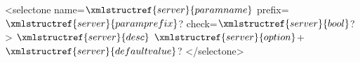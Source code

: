 <selectone name=$\xmlstructref{server}{paramname}$ prefix=$\xmlstructref{server}{paramprefix}$? check=$\xmlstructref{server}{bool}$? >
  $\xmlstructref{server}{desc}$
  $\xmlstructref{server}{option}$+
  $\xmlstructref{server}{defaultvalue}$?
</selectone>
